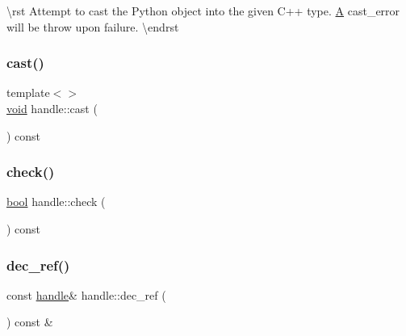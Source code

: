 \textbackslash{}rst Attempt to cast the Python object into the given C++ type. \mbox{\hyperlink{struct_a}{A}} {\ttfamily cast\+\_\+error} will be throw upon failure. \textbackslash{}endrst \mbox{\label{classhandle_aefa5deb13fb8fe6df3ed0f222863ee7e}} 
\subsubsection{\texorpdfstring{cast()}{cast()}\hspace{0.1cm}{\footnotesize\ttfamily [2/2]}}
{\footnotesize\ttfamily template$<$$>$ \\
\mbox{\hyperlink{_s_d_l__opengles2__gl2ext_8h_ae5d8fa23ad07c48bb609509eae494c95}{void}} handle\+::cast (\begin{DoxyParamCaption}{ }\end{DoxyParamCaption}) const\hspace{0.3cm}{\ttfamily [inline]}}

\mbox{\label{classhandle_a48e44d8de9e6c178fa698fb19efe113d}} 
\subsubsection{\texorpdfstring{check()}{check()}}
{\footnotesize\ttfamily \mbox{\hyperlink{asdl_8h_af6a258d8f3ee5206d682d799316314b1}{bool}} handle\+::check (\begin{DoxyParamCaption}{ }\end{DoxyParamCaption}) const\hspace{0.3cm}{\ttfamily [inline]}}

\mbox{\label{classhandle_a03747f7b62a7b61eb7d9d1df25bfa7c4}} 
\subsubsection{\texorpdfstring{dec\_ref()}{dec\_ref()}}
{\footnotesize\ttfamily const \mbox{\hyperlink{classhandle}{handle}}\& handle\+::dec\+\_\+ref (\begin{DoxyParamCaption}{ }\end{DoxyParamCaption}) const \&\hspace{0.3cm}{\ttfamily [inline]}}

